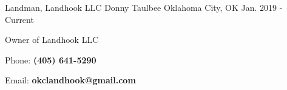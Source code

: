 \begin{cventries}
\cventry
{Landman, Landhook LLC} %
{Donny Taulbee} %
{Oklahoma City, OK} %
{Jan. 2019 - Current} %
{
	\begin{cvitems} %
		\item {Owner of Landhook LLC}
		\item{Phone: \textbf{(405) 641-5290}}
		\item{Email: \textbf{okclandhook@gmail.com}}
        \vspace{10mm}
	\end{cvitems}
}


\end{cventries}
